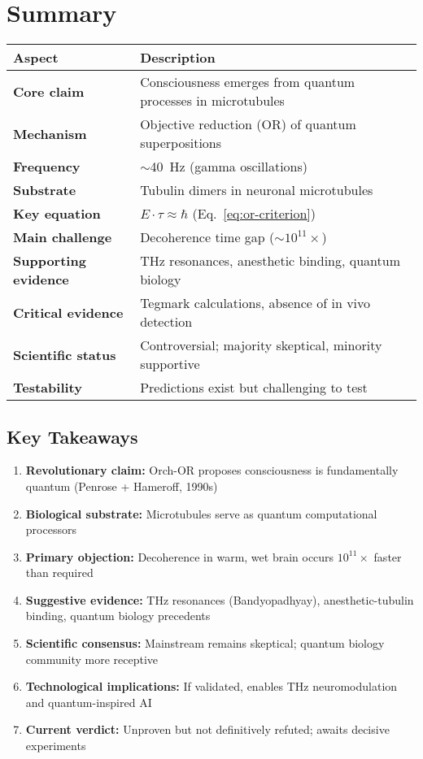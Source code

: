 \section{Summary}

\begin{center}
\begin{tabular}{@{}ll@{}}
\toprule
\textbf{Aspect} & \textbf{Description} \\
\midrule
\textbf{Core claim} & Consciousness emerges from quantum processes in microtubules \\
\textbf{Mechanism} & Objective reduction (OR) of quantum superpositions \\
\textbf{Frequency} & $\sim$40~Hz (gamma oscillations) \\
\textbf{Substrate} & Tubulin dimers in neuronal microtubules \\
\textbf{Key equation} & $E \cdot \tau \approx \hbar$ (Eq.~\ref{eq:or-criterion}) \\
\textbf{Main challenge} & Decoherence time gap ($\sim10^{11}\times$) \\
\textbf{Supporting evidence} & THz resonances, anesthetic binding, quantum biology \\
\textbf{Critical evidence} & Tegmark calculations, absence of in vivo detection \\
\textbf{Scientific status} & Controversial; majority skeptical, minority supportive \\
\textbf{Testability} & Predictions exist but challenging to test \\
\bottomrule
\end{tabular}
\end{center}

\subsection{Key Takeaways}

\begin{enumerate}
\item \textbf{Revolutionary claim:} Orch-OR proposes consciousness is fundamentally quantum (Penrose + Hameroff, 1990s)
\item \textbf{Biological substrate:} Microtubules serve as quantum computational processors
\item \textbf{Primary objection:} Decoherence in warm, wet brain occurs $10^{11}\times$ faster than required
\item \textbf{Suggestive evidence:} THz resonances (Bandyopadhyay), anesthetic-tubulin binding, quantum biology precedents
\item \textbf{Scientific consensus:} Mainstream remains skeptical; quantum biology community more receptive
\item \textbf{Technological implications:} If validated, enables THz neuromodulation and quantum-inspired AI
\item \textbf{Current verdict:} Unproven but not definitively refuted; awaits decisive experiments
\end{enumerate}

